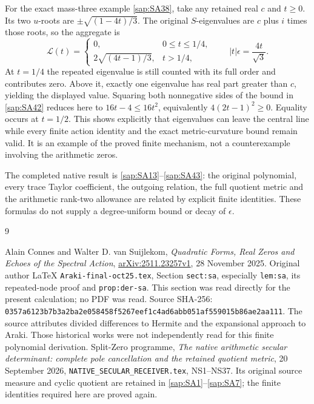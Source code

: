 For the exact mass-three example \eqref{sap:SA38}, take
any retained real $c$ and $t\geq0$. Its two $u$-roots
are $\pm\sqrt{(1-4t)/3}$. The original $S$-eigenvalues
are $c$ plus $i$ times those roots, so the aggregate is
\begin{equation}\tag{SA43}\label{sap:SA43}
\mathcal L(t)=
\begin{cases}
0,&0\leq t\leq1/4,\\
2\sqrt{(4t-1)/3},&t>1/4,
\end{cases}
\qquad |t|\epsilon=\frac{4t}{\sqrt3}.
\end{equation}
At $t=1/4$ the repeated eigenvalue is still counted with
its full order and contributes zero. Above it, exactly
one eigenvalue has real part greater than $c$, yielding
the displayed value. Squaring both nonnegative sides
of the bound in \eqref{sap:SA42} reduces here to
$16t-4\leq16t^2$, equivalently
$4(2t-1)^2\geq0$. Equality occurs at $t=1/2$.
This shows explicitly that eigenvalues can leave the
central line while every finite action identity and
the exact metric-curvature bound remain valid.
It is an example of the proved finite mechanism,
not a counterexample involving the arithmetic zeros.

The completed native result is \eqref{sap:SA13}--\eqref{sap:SA43}:
the original polynomial, every trace Taylor coefficient,
the outgoing relation, the full quotient metric and
the arithmetic rank-two allowance are related by
explicit finite identities. These formulas do not
supply a degree-uniform bound or decay of $\epsilon$.

\begin{thebibliography}{9}\raggedright
{} Alain Connes and Walter D. van Suijlekom,
\emph{Quadratic Forms, Real Zeros and Echoes of the Spectral Action},
\href{https://arxiv.org/abs/2511.23257v1}{arXiv:2511.23257v1},
28 November 2025. Original author LaTeX
\texttt{Araki-final-oct25.tex}, Section \texttt{sect:sa},
especially \texttt{lem:sa}, its repeated-node proof and
\texttt{prop:der-sa}. This section was read directly for
the present calculation; no PDF was read. Source SHA-256:
\texttt{0357a6123b7b3a2ba2e058458f5267eef1c4ad6abb051af559015b86ae2aa111}.
The source attributes divided differences to Hermite
and the expansional approach to Araki. Those historical
works were not independently read for this finite
polynomial derivation.
 Split-Zero programme,
\emph{The native arithmetic secular determinant:
complete pole cancellation and the retained quotient metric},
20 September 2026, \texttt{NATIVE\_SECULAR\_RECEIVER.tex},
NS1--NS37. Its original source measure and cyclic
quotient are retained in \eqref{sap:SA1}--\eqref{sap:SA7};
the finite identities required here are proved again.
\end{thebibliography}

